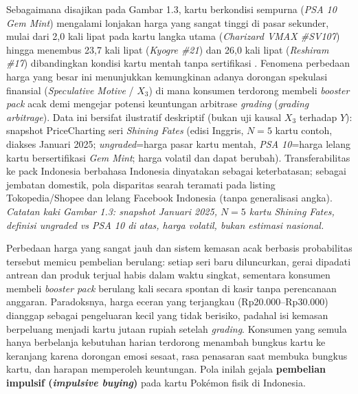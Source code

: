 \documentclass[12pt,a4paper]{article}
\numberwithin{equation}{section}
\numberwithin{table}{section}
\numberwithin{figure}{section}
\begin{document}
Sebagaimana disajikan pada Gambar 1.3, kartu berkondisi sempurna (\emph{PSA 10 Gem Mint}) mengalami lonjakan harga yang sangat tinggi di pasar sekunder, mulai dari 2,0 kali lipat pada kartu langka utama (\emph{Charizard VMAX \#SV107}) hingga menembus 23,7 kali lipat (\emph{Kyogre \#21}) dan 26,0 kali lipat (\emph{Reshiram \#17}) dibandingkan kondisi kartu mentah tanpa sertifikasi \citep{pricecharting2024}. Fenomena perbedaan harga yang besar ini menunjukkan kemungkinan adanya dorongan spekulasi finansial (\emph{Speculative Motive} / $X_3$) di mana konsumen terdorong membeli \emph{booster pack} acak demi mengejar potensi keuntungan arbitrase \emph{grading} (\emph{grading arbitrage}). Data ini bersifat ilustratif deskriptif (bukan uji kausal $X_3$ terhadap $Y$): snapshot PriceCharting seri \emph{Shining Fates} (edisi Inggris, $N=5$ kartu contoh, diakses Januari 2025; \emph{ungraded}=harga pasar kartu mentah, \emph{PSA 10}=harga lelang kartu bersertifikasi \emph{Gem Mint}; harga volatil dan dapat berubah). Transferabilitas ke pack Indonesia berbahasa Indonesia dinyatakan sebagai keterbatasan; sebagai jembatan domestik, pola disparitas searah teramati pada listing Tokopedia/Shopee dan lelang Facebook Indonesia (tanpa generalisasi angka). \emph{Catatan kaki Gambar 1.3: snapshot Januari 2025, $N=5$ kartu Shining Fates, definisi ungraded vs PSA 10 di atas, harga volatil, bukan estimasi nasional.}

Perbedaan harga yang sangat jauh dan sistem kemasan acak berbasis probabilitas tersebut memicu pembelian berulang: setiap seri baru diluncurkan, gerai dipadati antrean dan produk terjual habis dalam waktu singkat, sementara konsumen membeli \emph{booster pack} berulang kali secara spontan di kasir tanpa perencanaan anggaran. Paradoksnya, harga eceran yang terjangkau (Rp20.000--Rp30.000) dianggap sebagai pengeluaran kecil yang tidak berisiko, padahal isi kemasan berpeluang menjadi kartu jutaan rupiah setelah \emph{grading}. Konsumen yang semula hanya berbelanja kebutuhan harian terdorong menambah bungkus kartu ke keranjang karena dorongan emosi sesaat, rasa penasaran saat membuka bungkus kartu, dan harapan memperoleh keuntungan. Pola inilah gejala \textbf{pembelian impulsif (\emph{impulsive buying})} pada kartu Pok\'emon fisik di Indonesia.
\end{document}
